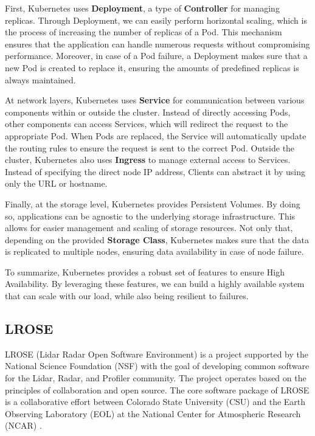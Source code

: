 First, Kubernetes uses \textbf{Deployment}, a type of \textbf{Controller} for
managing replicas. Through Deployment, we can easily perform horizontal scaling,
which is the process of increasing the number of replicas of a Pod. This
mechanism ensures that the application can handle numerous requests without
compromising performance. Moreover, in case of a Pod failure, a Deployment makes
sure that a new Pod is created to replace it, ensuring the amounts of predefined
replicas is always maintained.

At network layers, Kubernetes uses \textbf{Service} for communication between
various components within or outside the cluster. Instead of directly accessing
Pods, other components can access Services, which will redirect the request to
the appropriate Pod. When Pods are replaced, the Service will automatically
update the routing rules to ensure the request is sent to the correct Pod.
Outside the cluster, Kubernetes also uses \textbf{Ingress} to manage external
access to Services. Instead of specifying the direct node IP address, Clients
can abstract it by using only the URL or hostname.

Finally, at the storage level, Kubernetes provides Persistent Volumes. By doing
so, applications can be agnostic to the underlying storage infrastructure. This
allows for easier management and scaling of storage resources. Not only that,
depending on the provided \textbf{Storage Class}, Kubernetes makes sure that the
data is replicated to multiple nodes, ensuring data availability in case of node
failure.

To summarize, Kubernetes provides a robust set of features to ensure High
Availability. By leveraging these features, we can build a highly available
system that can scale with our load, while also being resilient to failures.

\subsection{LROSE}

LROSE (Lidar Radar Open Software Environment) is a project supported by the
National Science Foundation (NSF) with the goal of developing common software
for the Lidar, Radar, and Profiler community. The project operates based on the
principles of collaboration and open source. The core software package of LROSE
is a collaborative effort between Colorado State University (CSU) and the Earth
Observing Laboratory (EOL) at the National Center for Atmospheric Research
(NCAR) \cite{lrose}.


